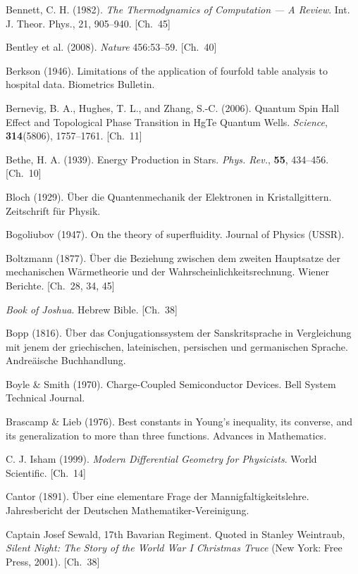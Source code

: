 \begin{list}{}{%
  \setlength{\leftmargin}{2em}%
  \setlength{\itemindent}{-2em}%
  \setlength{\itemsep}{0.35\baselineskip}%
  \setlength{\parsep}{0pt}%
  \setlength{\topsep}{0.5em}}
\item Bennett, C. H. (1982). \textit{The Thermodynamics of Computation — A Review}. Int. J. Theor. Phys., 21, 905–940. \hfill {\scriptsize [Ch.~45]}
\item Bentley et al. (2008). \textit{Nature} 456:53–59. \hfill {\scriptsize [Ch.~40]}
\item Berkson (1946). Limitations of the application of fourfold table analysis to hospital data. Biometrics Bulletin.
\item Bernevig, B. A., Hughes, T. L., and Zhang, S.-C. (2006). Quantum Spin Hall Effect and Topological Phase Transition in HgTe Quantum Wells. \textit{Science}, \textbf{314}(5806), 1757–1761. \hfill {\scriptsize [Ch.~11]}
\item Bethe, H. A. (1939). Energy Production in Stars. \textit{Phys. Rev.}, \textbf{55}, 434–456. \hfill {\scriptsize [Ch.~10]}
\item Bloch (1929). Über die Quantenmechanik der Elektronen in Kristallgittern. Zeitschrift für Physik.
\item Bogoliubov (1947). On the theory of superfluidity. Journal of Physics (USSR).
\item Boltzmann (1877). Über die Beziehung zwischen dem zweiten Hauptsatze der mechanischen Wärmetheorie und der Wahrscheinlichkeitsrechnung. Wiener Berichte. \hfill {\scriptsize [Ch.~28, 34, 45]}
\item \textit{Book of Joshua}. Hebrew Bible. \hfill {\scriptsize [Ch.~38]}
\item Bopp (1816). Über das Conjugationssystem der Sanskritsprache in Vergleichung mit jenem der griechischen, lateinischen, persischen und germanischen Sprache. Andreäische Buchhandlung.
\item Boyle \& Smith (1970). Charge-Coupled Semiconductor Devices. Bell System Technical Journal.
\item Brascamp \& Lieb (1976). Best constants in Young's inequality, its converse, and its generalization to more than three functions. Advances in Mathematics.
\item C. J. Isham (1999). \textit{Modern Differential Geometry for Physicists}. World Scientific. \hfill {\scriptsize [Ch.~14]}
\item Cantor (1891). Über eine elementare Frage der Mannigfaltigkeitslehre. Jahresbericht der Deutschen Mathematiker-Vereinigung.
\item Captain Josef Sewald, 17th Bavarian Regiment. Quoted in Stanley Weintraub, \textit{Silent Night: The Story of the World War I Christmas Truce} (New York: Free Press, 2001). \hfill {\scriptsize [Ch.~38]}

\end{list}
